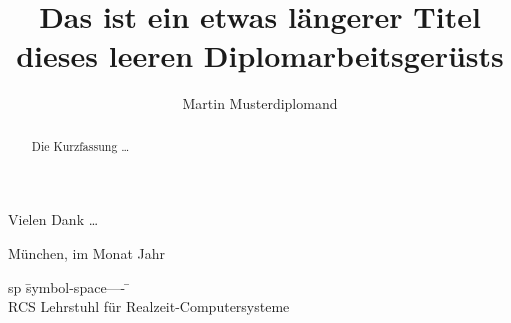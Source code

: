 \documentclass[%
	12pt,		%
	headinclude,	%
	a4paper,	%
	pointlessnumbers, %
	changebar,      %
	liststotoc,	%
	bibtotoc,
	idxtotoc,
	]{diplomarbeit}
\title{Das ist ein etwas längerer Titel\\
        dieses leeren Diplomarbeitsgerüsts}
\author{Martin Musterdiplomand}
\begin{document}
\renewcommand{\thepage}{t\arabic{page}}
\maketitle

 \pagestyle{empty}
\cleardoublepage 
\setcounter{page}{3}	%
\renewcommand{\thepage}{\roman{page}}
\begin{danksagung}
  Vielen Dank \dots

  München, im Monat Jahr
\end{danksagung}

\begin{Widmung}
\end{Widmung}

\clearpage
\pagestyle{headings}
\tableofcontents

\listoffigures
\listoftables
\begin{listofsymbols}
\begin{tabbing}
sp	\= symbol-space---- \= \kill \+ \\

RCS	\> Lehrstuhl für Realzeit-Computersysteme \\
\end{tabbing}
\end{listofsymbols}

\cleardoublepage 
\begin{abstract}
Die Kurzfassung \dots
\end{abstract}
\end{document}
